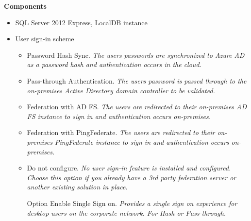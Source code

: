 \textbf{Components}
\begin{itemize}
\item SQL Server 2012 Express, LocalDB instance
\item User sign-in scheme
	\begin{itemize}
	\item Password Hash Sync. \textit{The users passwords are synchronized to Azure AD as a password hash and authentication occurs in the cloud.}
	\item Pass-through Authentication. \textit{The users password is passed through to the on-premises Active Directory domain controller to be validated.}
	\item Federation with AD FS. \textit{The users are redirected to their on-premises AD FS instance to sign in and authentication occurs on-premises.}
	\item Federation with PingFederate. \textit{ The users are redirected to their on-premises PingFederate instance to sign in and authentication occurs on-premises.}
	\item Do not configure. \textit{No user sign-in feature is installed and configured. Choose this option if you already have a 3rd party federation server or another existing solution in place.}
	\item [Option] Enable Single Sign on. \textit{Provides a single sign on experience for desktop users on the corporate network. For Hash or Pass-through.}
	\end{itemize}
\end{itemize}